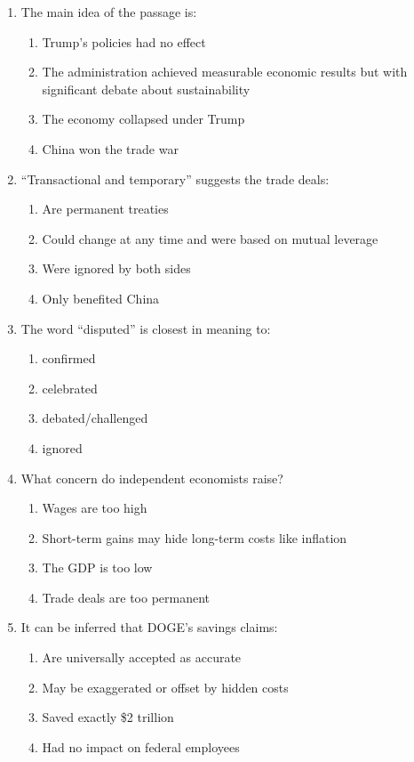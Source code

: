 \documentclass[10pt,a4paper]{article}
\begin{document}
\begin{enumerate}[label=\textbf{\arabic*.}]
\item The main idea of the passage is:
\begin{enumerate}[label=(\Alph*)]
\item Trump's policies had no effect
\item The administration achieved measurable economic results but
with significant debate about sustainability
\item The economy collapsed under Trump
\item China won the trade war
\end{enumerate}

\item ``Transactional and temporary'' suggests the trade deals:
\begin{enumerate}[label=(\Alph*)]
\item Are permanent treaties
\item Could change at any time and were based on mutual leverage
\item Were ignored by both sides
\item Only benefited China
\end{enumerate}

\item The word ``disputed'' is closest in meaning to:
\begin{enumerate}[label=(\Alph*)]
\item confirmed \item celebrated \item debated/challenged \item ignored
\end{enumerate}

\item What concern do independent economists raise?
\begin{enumerate}[label=(\Alph*)]
\item Wages are too high
\item Short-term gains may hide long-term costs like inflation
\item The GDP is too low
\item Trade deals are too permanent
\end{enumerate}

\item It can be inferred that DOGE's savings claims:
\begin{enumerate}[label=(\Alph*)]
\item Are universally accepted as accurate
\item May be exaggerated or offset by hidden costs
\item Saved exactly \$2 trillion
\item Had no impact on federal employees
\end{enumerate}
\end{enumerate}
\end{document}
